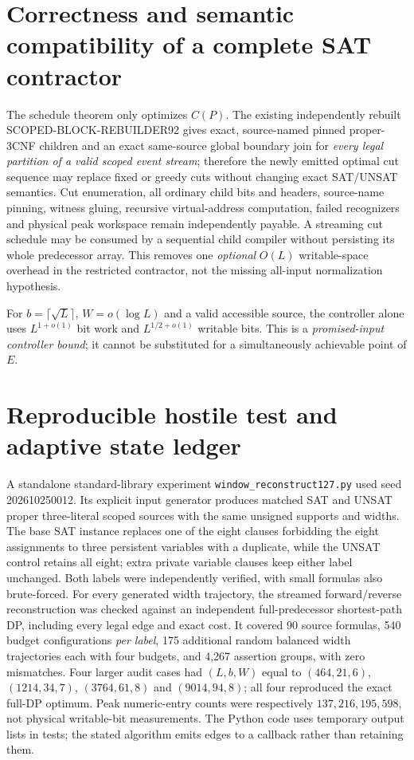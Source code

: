 \documentclass[11pt]{article}
\begin{document}
\section{Correctness and semantic compatibility of a complete SAT contractor}
The schedule theorem only optimizes $C(P)$. The existing independently rebuilt SCOPED-BLOCK-REBUILDER92 gives exact, source-named pinned proper-3CNF children and an exact same-source global boundary join for \emph{every legal partition of a valid scoped event stream}; therefore the newly emitted optimal cut sequence may replace fixed or greedy cuts without changing exact SAT/UNSAT semantics. Cut enumeration, all ordinary child bits and headers, source-name pinning, witness gluing, recursive virtual-address computation, failed recognizers and physical peak workspace remain independently payable. A streaming cut schedule may be consumed by a sequential child compiler without persisting its whole predecessor array. This removes one \emph{optional} $O(L)$ writable-space overhead in the restricted contractor, not the missing all-input normalization hypothesis.

For $b=\lceil\sqrt L\rceil$, $W=o(\log L)$ and a valid accessible source, the controller alone uses $L^{1+o(1)}$ bit work and $L^{1/2+o(1)}$ writable bits. This is a \emph{promised-input controller bound}; it cannot be substituted for a simultaneously achievable point of $E$.

\section{Reproducible hostile test and adaptive state ledger}
A standalone standard-library experiment \texttt{window\_reconstruct127.py} used seed 202610250012. Its explicit input generator produces matched SAT and UNSAT proper three-literal scoped sources with the same unsigned supports and widths. The base SAT instance replaces one of the eight clauses forbidding the eight assignments to three persistent variables with a duplicate, while the UNSAT control retains all eight; extra private variable clauses keep either label unchanged. Both labels were independently verified, with small formulas also brute-forced. For every generated width trajectory, the streamed forward/reverse reconstruction was checked against an independent full-predecessor shortest-path DP, including every legal edge and exact cost. It covered 90 source formulas, 540 budget configurations \emph{per label}, 175 additional random balanced width trajectories each with four budgets, and 4,267 assertion groups, with zero mismatches. Four larger audit cases had $(L,b,W)$ equal to $(464,21,6)$, $(1214,34,7)$, $(3764,61,8)$ and $(9014,94,8)$; all four reproduced the exact full-DP optimum. Peak numeric-entry counts were respectively $137,216,195,598$, not physical writable-bit measurements. The Python code uses temporary output lists in tests; the stated algorithm emits edges to a callback rather than retaining them.
\end{document}
